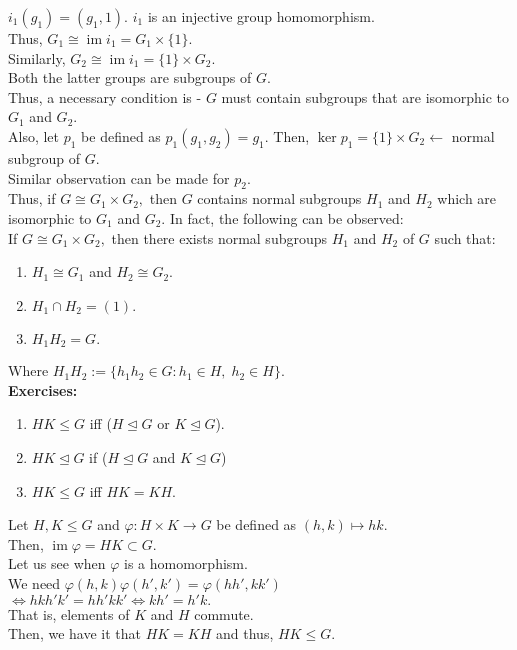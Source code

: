 \documentclass[12 pt, a4paper, toc=graduated, oneside]{article}
\theoremstyle{definition}
\newcommand{\im}{\operatorname{im}}
\begin{document}
$i_1(g_1) = (g_1, 1).$ $i_1$ is an injective group homomorphism.\\
Thus, $G_1 \cong \im i_1 = G_1 \times \{1\}.$\\
Similarly, $G_2 \cong \im i_1 = \{1\} \times G_2.$\\
Both the latter groups are subgroups of $G.$\\
Thus, a necessary condition is - $G$ must contain subgroups that are isomorphic to $G_1$ and $G_2.$\\
Also, let $p_1$	be defined as $p_1(g_1, g_2) = g_1.$ Then, $\ker p_1 = \{1\} \times G_2 \longleftarrow$ normal subgroup of $G.$\\
Similar observation can be made for $p_2.$\\
Thus, if $G \cong G_1 \times G_2,$ then $G$ contains normal subgroups $H_1$ and $H_2$ which are isomorphic to $G_1$ and $G_2.$ In fact, the following can be observed:\\
If $G \cong G_1 \times G_2,$ then there exists normal subgroups $H_1$ and $H_2$ of $G$ such that:
\begin{enumerate}[nosep] 
	\item $H_1 \cong G_1$ and $H_2 \cong G_2.$
	\item $H_1 \cap H_2 = (1).$
	\item $H_1 H_2 = G.$
\end{enumerate}
Where $H_1H_2 := \{h_1h_2 \in G : h_1 \in H, \; h_2 \in H\}.$\\
\textbf{Exercises:}
\begin{enumerate}[nosep] 
	\item $HK \le G$ iff ($H\trianglelefteq G$ or $K \trianglelefteq G$).
	\item $HK \trianglelefteq G$ if ($H\trianglelefteq G$ and $K \trianglelefteq G$)
	\item $HK \le G$ iff $HK = KH.$
\end{enumerate}
Let $H, K \le G$ and $\varphi:H\times K \to G$ be defined as $(h, k) \mapsto hk.$\\
Then, $\im \varphi = HK \subset G.$\\
Let us see when $\varphi$ is a homomorphism.\\
We need $\varphi(h, k)\varphi(h', k') = \varphi(hh', kk')$\\
$\iff hkh'k' = hh'kk' \iff kh' = h'k.$\\
That is, elements of $K$ and $H$ commute.\\
Then, we have it that $HK = KH$ and thus, $HK \le G.$\\
\end{document}
